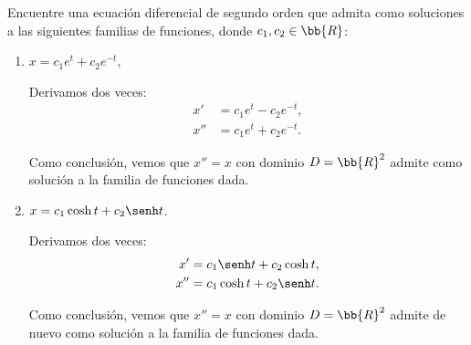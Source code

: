 \begin{ejercicio}
    Encuentre una ecuación diferencial de segundo orden que admita como soluciones a las siguientes familias de funciones, donde \(c_1, c_2 \in \bb{R}\):
    \begin{enumerate}
        \item \(x = c_1e^t + c_2e^{-t}\),
        
        Derivamos dos veces:
        \begin{align*}
            x' &= c_1e^t - c_2e^{-t},\\
            x'' &= c_1e^t + c_2e^{-t}.
        \end{align*}

        Como conclusión, vemos que $x''=x$ con dominio $D=\bb{R}^2$ admite como solución a la familia de funciones dada.
        \item \(x = c_1\cosh t + c_2\senh t\).
        
        Derivamos dos veces:
        \begin{align*}
            x' &= c_1\senh t + c_2\cosh t,\\
            x'' &= c_1\cosh t + c_2\senh t.
        \end{align*}

        Como conclusión, vemos que $x''=x$ con dominio $D=\bb{R}^2$ admite de nuevo como solución a la familia de funciones dada.
    \end{enumerate}
\end{ejercicio}


